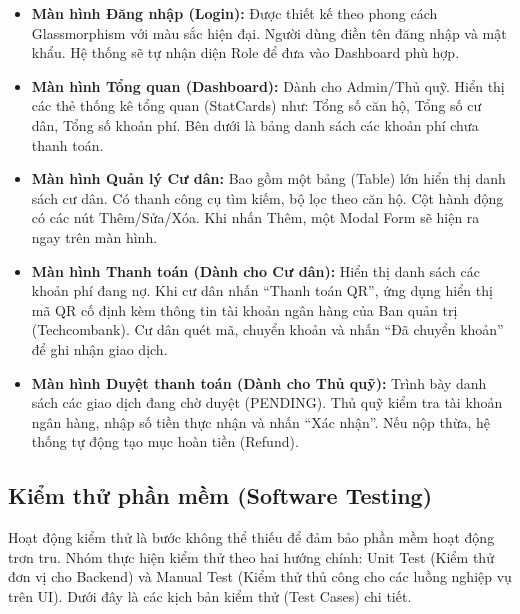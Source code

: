 \documentclass[12pt,a4paper]{article}
\begin{document}
\begin{itemize}
    \item \textbf{Màn hình Đăng nhập (Login):} Được thiết kế theo phong cách Glassmorphism với màu sắc hiện đại. Người dùng điền tên đăng nhập và mật khẩu. Hệ thống sẽ tự nhận diện Role để đưa vào Dashboard phù hợp.
    \item \textbf{Màn hình Tổng quan (Dashboard):} Dành cho Admin/Thủ quỹ. Hiển thị các thẻ thống kê tổng quan (StatCards) như: Tổng số căn hộ, Tổng số cư dân, Tổng số khoản phí. Bên dưới là bảng danh sách các khoản phí chưa thanh toán.
    \item \textbf{Màn hình Quản lý Cư dân:} Bao gồm một bảng (Table) lớn hiển thị danh sách cư dân. Có thanh công cụ tìm kiếm, bộ lọc theo căn hộ. Cột hành động có các nút Thêm/Sửa/Xóa. Khi nhấn Thêm, một Modal Form sẽ hiện ra ngay trên màn hình.
    \item \textbf{Màn hình Thanh toán (Dành cho Cư dân):} Hiển thị danh sách các khoản phí đang nợ. Khi cư dân nhấn ``Thanh toán QR'', ứng dụng hiển thị mã QR cố định kèm thông tin tài khoản ngân hàng của Ban quản trị (Techcombank). Cư dân quét mã, chuyển khoản và nhấn ``Đã chuyển khoản'' để ghi nhận giao dịch.
    \item \textbf{Màn hình Duyệt thanh toán (Dành cho Thủ quỹ):} Trình bày danh sách các giao dịch đang chờ duyệt (PENDING). Thủ quỹ kiểm tra tài khoản ngân hàng, nhập số tiền thực nhận và nhấn ``Xác nhận''. Nếu nộp thừa, hệ thống tự động tạo mục hoàn tiền (Refund).
\end{itemize}

\subsection{Kiểm thử phần mềm (Software Testing)}

Hoạt động kiểm thử là bước không thể thiếu để đảm bảo phần mềm hoạt động trơn tru. Nhóm thực hiện kiểm thử theo hai hướng chính: Unit Test (Kiểm thử đơn vị cho Backend) và Manual Test (Kiểm thử thủ công cho các luồng nghiệp vụ trên UI). Dưới đây là các kịch bản kiểm thử (Test Cases) chi tiết.
\end{document}
